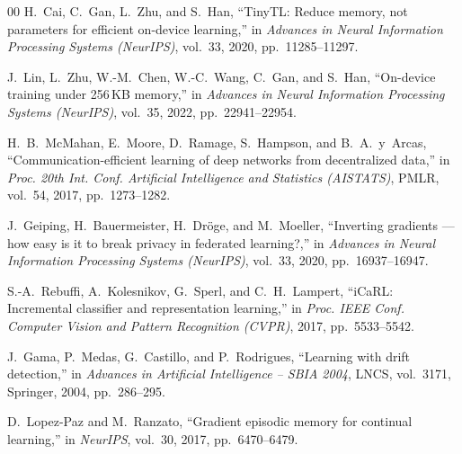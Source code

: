 \documentclass[conference]{IEEEtran}
\begin{document}
\begin{thebibliography}{00}
H.~Cai, C.~Gan, L.~Zhu, and S.~Han,
``TinyTL: Reduce memory, not parameters for efficient on-device
learning,''
in \textit{Advances in Neural Information Processing Systems
(NeurIPS)}, vol.~33, 2020, pp.~11285--11297.

J.~Lin, L.~Zhu, W.-M.~Chen, W.-C.~Wang, C.~Gan, and S.~Han,
``On-device training under 256\,KB memory,''
in \textit{Advances in Neural Information Processing Systems
(NeurIPS)}, vol.~35, 2022, pp.~22941--22954.

H.~B.~McMahan, E.~Moore, D.~Ramage, S.~Hampson, and B.~A.~y~Arcas,
``Communication-efficient learning of deep networks from decentralized
data,''
in \textit{Proc. 20th Int. Conf. Artificial Intelligence and
Statistics (AISTATS)}, PMLR, vol.~54, 2017, pp.~1273--1282.

J.~Geiping, H.~Bauermeister, H.~Dr\"oge, and M.~Moeller,
``Inverting gradients --- how easy is it to break privacy in
federated learning?,''
in \textit{Advances in Neural Information Processing Systems
(NeurIPS)}, vol.~33, 2020, pp.~16937--16947.

S.-A.~Rebuffi, A.~Kolesnikov, G.~Sperl, and C.~H.~Lampert,
``iCaRL: Incremental classifier and representation learning,''
in \textit{Proc. IEEE Conf. Computer Vision and Pattern Recognition
(CVPR)}, 2017, pp.~5533--5542.

J.~Gama, P.~Medas, G.~Castillo, and P.~Rodrigues,
``Learning with drift detection,''
in \textit{Advances in Artificial Intelligence -- SBIA 2004},
LNCS, vol.~3171, Springer, 2004, pp.~286--295.

D.~Lopez-Paz and M.~Ranzato, ``Gradient episodic memory for
continual learning,'' in \textit{NeurIPS}, vol.~30, 2017,
pp.~6470--6479.

\end{thebibliography}
\end{document}
